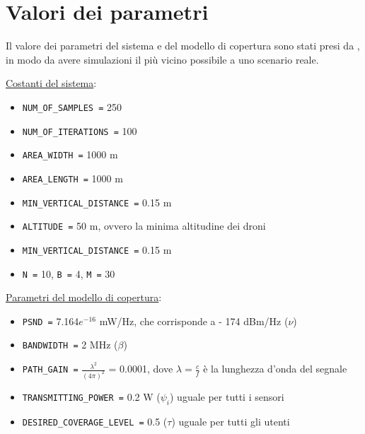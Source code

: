 \section{Valori dei parametri} \label{sec:param_vals}
Il valore dei parametri del sistema e del modello di copertura sono stati presi da \cite{valoriForti}, in modo da avere simulazioni il più vicino possibile a uno scenario reale.

\underline{Costanti del sistema}:
\begin{multicols}{2}
\begin{itemize}

\item \texttt{NUM\_OF\_SAMPLES =} 250

\item \texttt{NUM\_OF\_ITERATIONS =} 100

\item \texttt{AREA\_WIDTH =} 1000 m

\item \texttt{AREA\_LENGTH =} 1000 m

\item \texttt{MIN\_VERTICAL\_DISTANCE =} 0.15 m

\item \texttt{ALTITUDE =} 50 m, ovvero la minima altitudine dei droni

\item \texttt{MIN\_VERTICAL\_DISTANCE =} 0.15 m

\item \texttt{N =} 10, \texttt{B =} 4, \texttt{M =} 30

\end{itemize}
\end{multicols}

\underline{Parametri del modello di copertura}:
\begin{multicols}{2}
\begin{itemize}

\item \texttt{PSND =} 7.164$e^{-16}$ mW/Hz, che corrisponde a - 174 dBm/Hz ($\nu$)

\item \texttt{BANDWIDTH =} 2 MHz ($\beta$)

\item \texttt{PATH\_GAIN    =} $\frac{\lambda^2}{(4\pi)^2}$ = 0.0001, dove $\lambda=\frac{c}{f}$ è la lunghezza d'onda del segnale

\item \texttt{TRANSMITTING\_POWER =} 0.2 W ($\psi_i$) uguale per tutti i sensori

\item \texttt{DESIRED\_COVERAGE\_LEVEL =} 0.5 ($\tau$) uguale per tutti gli utenti

\end{itemize}
\end{multicols}

